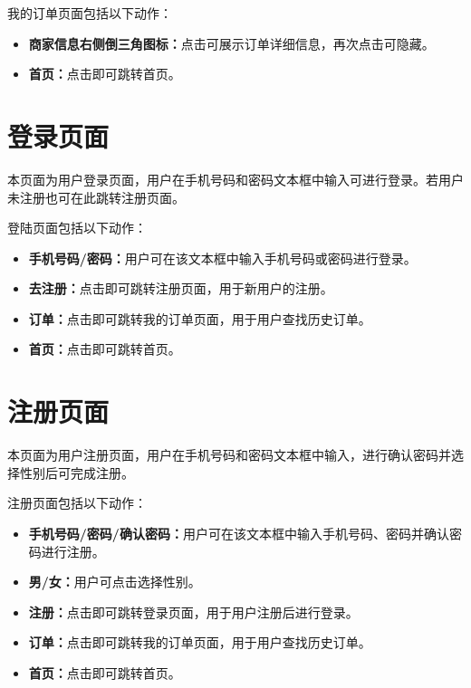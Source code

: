 \documentclass[UTF8]{ctexart}
\begin{document}
我的订单页面包括以下动作：
\begin{itemize}
    \item \textbf{商家信息右侧倒三角图标：}点击可展示订单详细信息，再次点击可隐藏。
    \item \textbf{首页：}点击即可跳转首页。
\end{itemize}

\section{登录页面}
本页面为用户登录页面，用户在手机号码和密码文本框中输入可进行登录。若用户未注册也可在此跳转注册页面。

登陆页面包括以下动作：
\begin{itemize}
    \item \textbf{手机号码/密码：}用户可在该文本框中输入手机号码或密码进行登录。
    \item \textbf{去注册：}点击即可跳转注册页面，用于新用户的注册。
    \item \textbf{订单：}点击即可跳转我的订单页面，用于用户查找历史订单。
    \item \textbf{首页：}点击即可跳转首页。
\end{itemize}

\section{注册页面}
本页面为用户注册页面，用户在手机号码和密码文本框中输入，进行确认密码并选择性别后可完成注册。

注册页面包括以下动作：
\begin{itemize}
    \item \textbf{手机号码/密码/确认密码：}用户可在该文本框中输入手机号码、密码并确认密码进行注册。
    \item \textbf{男/女：}用户可点击选择性别。
    \item \textbf{注册：}点击即可跳转登录页面，用于用户注册后进行登录。
    \item \textbf{订单：}点击即可跳转我的订单页面，用于用户查找历史订单。
    \item \textbf{首页：}点击即可跳转首页。
\end{itemize}
\end{document}
